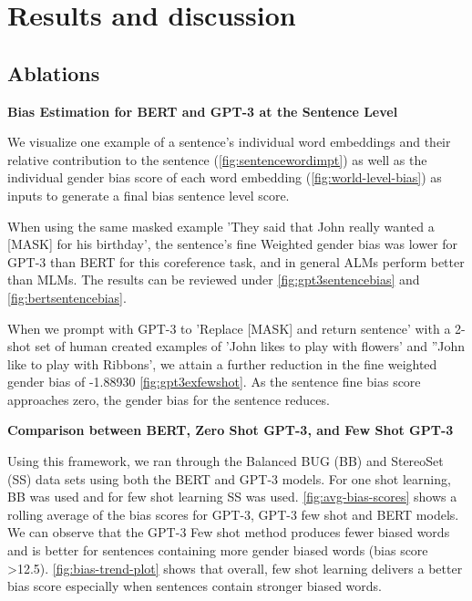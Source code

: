 \documentclass[11pt]{article}
\begin{document}
\section{Results and discussion}

\subsection{Ablations}

\textbf{Bias Estimation for BERT and GPT-3 at the Sentence Level}

We visualize one example of a  sentence's individual word embeddings and their relative contribution to the sentence (\autoref{fig:sentencewordimpt}) as well as the individual gender bias score of each word embedding (\autoref{fig:world-level-bias}) as inputs to generate a final bias sentence level score. 

When using the same masked example 'They said that John really wanted a [MASK] for his birthday', the sentence's fine Weighted gender bias was lower for GPT-3 than BERT for this coreference task, and in general ALMs perform better than MLMs. The results can be reviewed under \autoref{fig:gpt3sentencebias} and \autoref{fig:bertsentencebias}.

When we prompt with GPT-3 to 'Replace [MASK] and return sentence' with a 2-shot set of human created examples of 'John likes to play with flowers' and ''John like to play with Ribbons', we attain a further reduction in the fine weighted gender bias of -1.88930 \autoref{fig:gpt3exfewshot}. As the sentence fine bias score approaches zero, the gender bias for the sentence reduces.

\textbf{Comparison between BERT, Zero Shot GPT-3, and Few Shot GPT-3}

Using this framework, we ran through the Balanced BUG (BB) and StereoSet (SS) data sets using both the BERT and GPT-3 models. For one shot learning, BB was used and for few shot learning SS was used. \autoref{fig:avg-bias-scores} shows a rolling average of the bias scores for GPT-3, GPT-3 few shot and BERT models. We can observe that the GPT-3 Few shot method produces fewer biased words and is better for sentences containing more gender biased words (bias score >12.5). \autoref{fig:bias-trend-plot} shows that overall, few shot learning delivers a better bias score especially when sentences contain stronger biased words.
\end{document}
